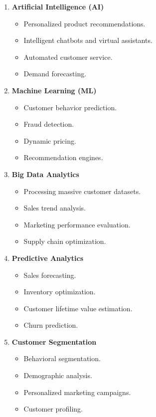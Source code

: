 \documentclass[12pt]{article}
\begin{document}
\begin{enumerate}

\item \textbf{Artificial Intelligence (AI)}
\begin{itemize}
    \item Personalized product recommendations.
    \item Intelligent chatbots and virtual assistants.
    \item Automated customer service.
    \item Demand forecasting.
\end{itemize}

\item \textbf{Machine Learning (ML)}
\begin{itemize}
    \item Customer behavior prediction.
    \item Fraud detection.
    \item Dynamic pricing.
    \item Recommendation engines.
\end{itemize}

\item \textbf{Big Data Analytics}
\begin{itemize}
    \item Processing massive customer datasets.
    \item Sales trend analysis.
    \item Marketing performance evaluation.
    \item Supply chain optimization.
\end{itemize}

\item \textbf{Predictive Analytics}
\begin{itemize}
    \item Sales forecasting.
    \item Inventory optimization.
    \item Customer lifetime value estimation.
    \item Churn prediction.
\end{itemize}

\item \textbf{Customer Segmentation}
\begin{itemize}
    \item Behavioral segmentation.
    \item Demographic analysis.
    \item Personalized marketing campaigns.
    \item Customer profiling.
\end{itemize}


\end{enumerate}
\end{document}
